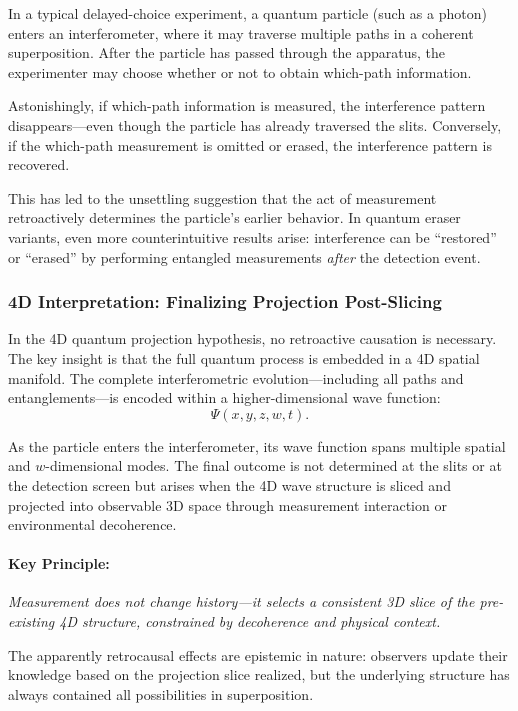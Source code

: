 \documentclass[12pt]{article}
\begin{document}
In a typical delayed-choice experiment, a quantum particle (such as a photon) enters an interferometer, where it may traverse multiple paths in a coherent superposition. After the particle has passed through the apparatus, the experimenter may choose whether or not to obtain which-path information.

Astonishingly, if which-path information is measured, the interference pattern disappears—even though the particle has already traversed the slits. Conversely, if the which-path measurement is omitted or erased, the interference pattern is recovered.

This has led to the unsettling suggestion that the act of measurement retroactively determines the particle’s earlier behavior. In quantum eraser variants, even more counterintuitive results arise: interference can be “restored” or “erased” by performing entangled measurements \emph{after} the detection event.

\subsubsection{4D Interpretation: Finalizing Projection Post-Slicing}

In the 4D quantum projection hypothesis, no retroactive causation is necessary. The key insight is that the full quantum process is embedded in a 4D spatial manifold. The complete interferometric evolution—including all paths and entanglements—is encoded within a higher-dimensional wave function:
\begin{equation}
\Psi(x, y, z, w, t).
\end{equation}

As the particle enters the interferometer, its wave function spans multiple spatial and \( w \)-dimensional modes. The final outcome is not determined at the slits or at the detection screen but arises when the 4D wave structure is sliced and projected into observable 3D space through measurement interaction or environmental decoherence.

\paragraph{\textbf{Key Principle:}}  
\textit{Measurement does not change history—it selects a consistent 3D slice of the pre-existing 4D structure, constrained by decoherence and physical context.}

The apparently retrocausal effects are epistemic in nature: observers update their knowledge based on the projection slice realized, but the underlying structure has always contained all possibilities in superposition.
\end{document}
